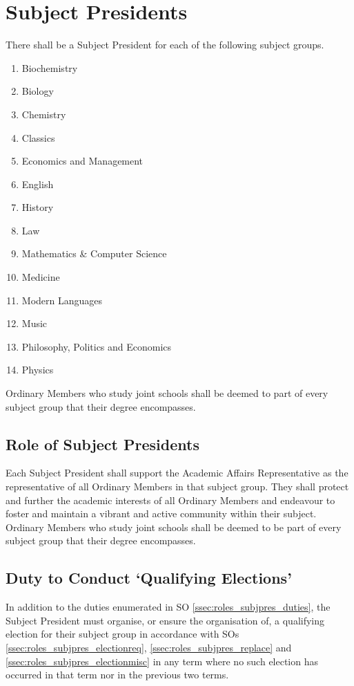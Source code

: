 \section{Subject Presidents} \label{sec:roles_subjpres}
\npara There shall be a Subject President for each of the following subject groups.	
\begin{enumerate}
	\item Biochemistry
	\item Biology
	\item Chemistry
	\item Classics
	\item Economics and Management
	\item English
	\item History
	\item Law
	\item Mathematics \& Computer Science
	\item Medicine
	\item Modern Languages
	\item Music
	\item Philosophy, Politics and Economics
	\item Physics
\end{enumerate}
Ordinary Members who study joint schools shall be deemed to part of every subject group that their degree encompasses.
\subsection{Role of Subject Presidents}
Each Subject President shall support the Academic Affairs Representative as the representative of all Ordinary Members in that subject group. They shall protect and further the academic interests of all Ordinary Members and endeavour to foster and maintain a vibrant and active community within their subject. Ordinary Members who study joint schools shall be deemed to be part of every subject group that their degree encompasses.
\subsection{Duty to Conduct `Qualifying Elections'} \label{ssec:roles_subjpres_electionduty}
In addition to the duties enumerated in SO \ref{ssec:roles_subjpres_duties}, the Subject President must organise, or ensure the organisation of, a qualifying election for their subject group in accordance with SOs \ref{ssec:roles_subjpres_electionreq}, \ref{ssec:roles_subjpres_replace} and \ref{ssec:roles_subjpres_electionmisc} in any term where no such election has occurred in that term nor in the previous two terms.
